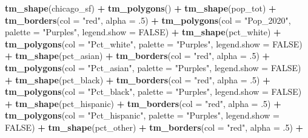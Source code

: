 \documentclass[
]{article}
\newenvironment{Shaded}{\begin{snugshade}}{\end{snugshade}}
\newcommand{\AttributeTok}[1]{\textcolor[rgb]{0.13,0.29,0.53}{#1}}
\newcommand{\ConstantTok}[1]{\textcolor[rgb]{0.56,0.35,0.01}{#1}}
\newcommand{\DecValTok}[1]{\textcolor[rgb]{0.00,0.00,0.81}{#1}}
\newcommand{\FunctionTok}[1]{\textcolor[rgb]{0.13,0.29,0.53}{\textbf{#1}}}
\newcommand{\NormalTok}[1]{#1}
\newcommand{\SpecialCharTok}[1]{\textcolor[rgb]{0.81,0.36,0.00}{\textbf{#1}}}
\newcommand{\StringTok}[1]{\textcolor[rgb]{0.31,0.60,0.02}{#1}}
\begin{document}
\begin{Shaded}
\begin{Highlighting}[]
\FunctionTok{tm\_shape}\NormalTok{(chicago\_sf) }\SpecialCharTok{+}
  \FunctionTok{tm\_polygons}\NormalTok{() }\SpecialCharTok{+}
\FunctionTok{tm\_shape}\NormalTok{(pop\_tot) }\SpecialCharTok{+}
  \FunctionTok{tm\_borders}\NormalTok{(}\AttributeTok{col =} \StringTok{"red"}\NormalTok{, }\AttributeTok{alpha =}\NormalTok{ .}\DecValTok{5}\NormalTok{) }\SpecialCharTok{+}
  \FunctionTok{tm\_polygons}\NormalTok{(}\AttributeTok{col =} \StringTok{"Pop\_2020"}\NormalTok{,}
              \AttributeTok{palette =} \StringTok{"Purples"}\NormalTok{,}
              \AttributeTok{legend.show =} \ConstantTok{FALSE}\NormalTok{) }\SpecialCharTok{+}
  \FunctionTok{tm\_shape}\NormalTok{(pct\_white) }\SpecialCharTok{+}
  \FunctionTok{tm\_polygons}\NormalTok{(}\AttributeTok{col =} \StringTok{"Pct\_white"}\NormalTok{,}
              \AttributeTok{palette =} \StringTok{"Purples"}\NormalTok{,}
              \AttributeTok{legend.show =} \ConstantTok{FALSE}\NormalTok{) }\SpecialCharTok{+}
  \FunctionTok{tm\_shape}\NormalTok{(pct\_asian) }\SpecialCharTok{+}
  \FunctionTok{tm\_borders}\NormalTok{(}\AttributeTok{col =} \StringTok{"red"}\NormalTok{, }\AttributeTok{alpha =}\NormalTok{ .}\DecValTok{5}\NormalTok{) }\SpecialCharTok{+}
  \FunctionTok{tm\_polygons}\NormalTok{(}\AttributeTok{col =} \StringTok{"Pct\_asian"}\NormalTok{,}
              \AttributeTok{palette =} \StringTok{"Purples"}\NormalTok{,}
              \AttributeTok{legend.show =} \ConstantTok{FALSE}\NormalTok{) }\SpecialCharTok{+}
  \FunctionTok{tm\_shape}\NormalTok{(pct\_black) }\SpecialCharTok{+}
  \FunctionTok{tm\_borders}\NormalTok{(}\AttributeTok{col =} \StringTok{"red"}\NormalTok{, }\AttributeTok{alpha =}\NormalTok{ .}\DecValTok{5}\NormalTok{) }\SpecialCharTok{+}
  \FunctionTok{tm\_polygons}\NormalTok{(}\AttributeTok{col =} \StringTok{"Pct\_black"}\NormalTok{,}
              \AttributeTok{palette =} \StringTok{"Purples"}\NormalTok{,}
              \AttributeTok{legend.show =} \ConstantTok{FALSE}\NormalTok{) }\SpecialCharTok{+}
  \FunctionTok{tm\_shape}\NormalTok{(pct\_hispanic) }\SpecialCharTok{+}
  \FunctionTok{tm\_borders}\NormalTok{(}\AttributeTok{col =} \StringTok{"red"}\NormalTok{, }\AttributeTok{alpha =}\NormalTok{ .}\DecValTok{5}\NormalTok{) }\SpecialCharTok{+}
  \FunctionTok{tm\_polygons}\NormalTok{(}\AttributeTok{col =} \StringTok{"Pct\_hispanic"}\NormalTok{,}
              \AttributeTok{palette =} \StringTok{"Purples"}\NormalTok{,}
              \AttributeTok{legend.show =} \ConstantTok{FALSE}\NormalTok{) }\SpecialCharTok{+}
  \FunctionTok{tm\_shape}\NormalTok{(pct\_other) }\SpecialCharTok{+}
  \FunctionTok{tm\_borders}\NormalTok{(}\AttributeTok{col =} \StringTok{"red"}\NormalTok{, }\AttributeTok{alpha =}\NormalTok{ .}\DecValTok{5}\NormalTok{) }\SpecialCharTok{+}

\end{Highlighting}
\end{Shaded}
\end{document}
